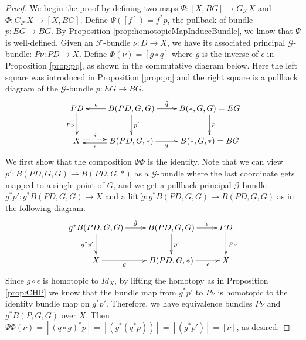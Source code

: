\documentclass[psamsfonts]{amsart}
\theoremstyle{definition}
\theoremstyle{remark}
\numberwithin{equation}{section}
\begin{document}
\begin{proof}
We begin the proof by defining two maps $\Psi: [X, BG] \rightarrow G_{\mathcal{F}}X$ and $\Phi: G_{\mathcal{F}}X \rightarrow [X, BG]$. Define $\Psi([f]) = f^{*}p$, the pullback of bundle $p: EG \rightarrow BG$. By Proposition \ref{prop:homotopicMapInduceBundle}, we know that $\Psi$ is well-defined. Given an  $\mathcal{F}$-bundle $\nu: D \rightarrow X$, we have its associated principal $\mathcal{G}$-bundle: $P\nu: PD \rightarrow X$. Define $\Phi(\nu) = [g \circ q]$ where $g$ is the inverse of $\epsilon$ in Proposition \ref{prop:pq}, as shown in the commutative diagram below. Here the left square was introduced in Proposition \ref{prop:pq} and the right square is a pullback diagram of the $\mathcal{G}$-bundle $p: EG \to BG$.
\begin{equation}
\label{pic:pq}
	\xymatrix{
PD \ar[d]_{P\nu} & B(PD, G, G) \ar[l]_-{\epsilon} \ar[d]^{p'} \ar[r]^-{\tilde{q}} & B(*, G, G) = EG \ar[d]^{p} \\
X \ar@{.>}[r]<.5ex>^-{g} & B(PD, G, *) \ar[l]<.5ex>^-{\epsilon} \ar[r]_-{q} & B(*, G, *) = BG \\} 
\end{equation}
We first show that the composition $\Psi\Phi$ is the identity. Note that we can view $p': B(PD, G, G) \to B(PD, G, *)$ as a $\mathcal{G}$-bundle where the last coordinate gets mapped to a single point of $G$, and we get a pullback principal $\mathcal{G}$-bundle $g^{*}p': g^{*}B(PD, G, G) \rightarrow X$ and a lift $\tilde{g}: g^{*}B(PD, G, G) \rightarrow B(PD, G, G)$ as in the following diagram. 
\[\xymatrix{
g^{*}B(PD, G, G) \ar[r]^-{\tilde{g}} \ar[d]_{g^{*}p'} & B(PD, G, G) \ar[d]^{p'} \ar[r]^-{\epsilon} & PD \ar[d]^{P\nu}\\
X \ar[r]_-{g} & B(PD, G, *) \ar[r]_-{\epsilon} & X\\} \]
Since $g \circ \epsilon$ is homotopic to $Id_{X}$, by lifting the homotopy as in Proposition \ref{prop:CHP} we know that the bundle map from $g^{*}p'$ to $P\nu$ is homotopic to the identity bundle map on $g^{*}p'$. Therefore, we have equivalence bundles $P\nu$ and $g^{*}B(P, G, G)$ over $X$. Then $\Psi\Phi(\nu) = [(q \circ g)^{*}p] = [(g^{*}(q^{*}p))] = [(g^{*}p')] = [\nu]$, as desired.


\end{proof}
\end{document}
